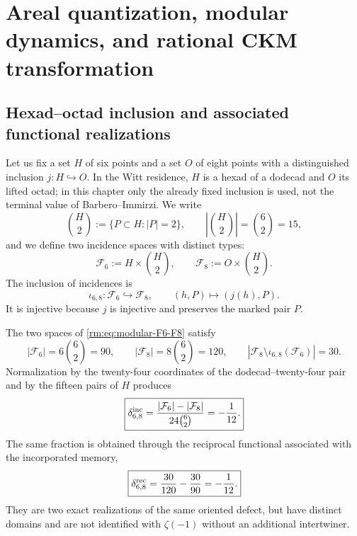 \section{Areal quantization, modular dynamics, and rational CKM transformation}
\label{rm:ch:modular}

\subsection{Hexad--octad inclusion and associated functional realizations}

Let us fix a set \(H\) of six points and a set \(O\) of eight
points with a distinguished inclusion \(j:H\hookrightarrow O\). In the
Witt residence, \(H\) is a hexad of a dodecad and \(O\) its lifted octad;
in this chapter only the already fixed inclusion is used, not the
terminal value of Barbero--Immirzi. We write
\begin{equation}
\label{rm:eq:modular-pairs-H}
\binom H2:=\{P\subset H:|P|=2\},
\qquad \left|\binom H2\right|=\binom62=15,
\end{equation}
and we define two incidence spaces with distinct types:
\begin{equation}
\label{rm:eq:modular-F6-F8}
\mathcal F_6:=H\times\binom H2,
\qquad
\mathcal F_8:=O\times\binom H2.
\end{equation}
The inclusion of incidences is
\begin{equation}
\label{rm:eq:modular-iota68}
\iota_{6,8}:\mathcal F_6\hookrightarrow\mathcal F_8,
\qquad
(h,P)\longmapsto(j(h),P).
\end{equation}
It is injective because \(j\) is injective and preserves the marked pair \(P\).

\begin{theorem}
\label{rm:thm:modular-incidence-90-120}
The two spaces of \cref{rm:eq:modular-F6-F8} satisfy
\begin{equation}
\label{rm:eq:modular-counts-90-120}
|\mathcal F_6|=6\binom62=90,
\qquad
|\mathcal F_8|=8\binom62=120,
\qquad
|\mathcal F_8\setminus\iota_{6,8}(\mathcal F_6)|=30.
\end{equation}
Normalization by the twenty-four coordinates of the
dodecad--twenty-four pair and by the fifteen pairs of \(H\) produces
\begin{equation}
\label{rm:eq:modular-incidence-defect}
\boxed{
\delta_{6,8}^{\rm inc}
=\frac{|\mathcal F_6|-|\mathcal F_8|}
{24\binom62}=-\frac1{12}.}
\end{equation}
The same fraction is obtained through the reciprocal functional associated
with the incorporated memory,
\begin{equation}
\label{rm:eq:modular-reciprocal-defect}
\boxed{
\delta_{6,8}^{\rm rec}
=\frac{30}{120}-\frac{30}{90}=-\frac1{12}.}
\end{equation}
They are two exact realizations of the same oriented defect, but have
distinct domains and are not identified with \(\zeta(-1)\) without an
additional intertwiner.
\end{theorem}


